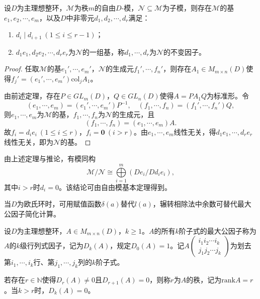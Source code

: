 \documentclass[../../main.tex]{subfiles}%
\begin{document}
\begin{corollary}
设$D$为主理想整环，$\mathscr{M}$为秩$m$的自由$D$-模，$\mathscr{N}\subseteq\mathscr{M}$为子模，则存在$\mathscr{M}$的基$e_1,e_2,\cdots,e_m$，以及$D$中非零元$d_1,d_2,\cdots,d_r$满足：
\begin{enumerate}[(1)]
\item $d_i\mid d_{i+1}\ (1\leqslant i\leqslant r-1)$；
\item $d_1e_1,d_2e_2,\cdots,d_re_r$为$\mathscr{N}$的一组基，称$d_1,\cdots,d_r$为$\mathscr{N}$的不变因子。
\end{enumerate}
\end{corollary}

\begin{proof}

任取$\mathscr{M}$的基$e_1',\cdots,e_m'$，$\mathscr{N}$的生成元$f_1',\cdots,f_n'$，则存在$A_1\in M_{m\times n}(D)$使得$f_j'=(e_1',\cdots,e_m')\mathrm{col}_jA_1$。

由前述定理，存在$P\in GL_m(D)$，$Q\in GL_n(D)$使得$A=PA_1Q$为标准形。令
$$(e_1,\cdots,e_m)=(e_1',\cdots,e_m')P^{-1},\quad (f_1,\cdots,f_n)=(f_1',\cdots,f_n')Q,$$
则$e_1,\cdots,e_m$为$\mathscr{M}$的基，$f_1,\cdots,f_n$为$\mathscr{N}$的生成元，且
$$(f_1,\cdots,f_n)=(e_1,\cdots,e_m)A.$$
故$f_i=d_ie_i\ (1\leqslant i\leqslant r)$，$f_i=\boldsymbol{0}\ (i>r)$。由$e_1,\cdots,e_m$线性无关，得$d_1e_1,\cdots,d_re_r$线性无关，即为$\mathscr{N}$的基。

\end{proof}

\begin{remark}
由上述定理与推论，有模同构
$$\mathscr{M}/\mathscr{N}\cong\bigoplus\limits_{i=1}^m(De_i/Dd_ie_i),$$
其中$i>r$时$d_i=0$。该结论可由自由模基本定理得到。
\end{remark}

\begin{remark}
当$D$为欧氏环时，可用赋值函数$\delta(a)$替代$l(a)$，辗转相除法中余数可替代最大公因子简化计算。
\end{remark}

\begin{definition}
设$D$为主理想整环，$A\in M_{m\times n}(D)$，$k\geqslant1$。$A$的所有$k$阶子式的最大公因子称为$A$的$k$级行列式因子，记为$D_k(A)$，规定$D_0(A)=1$。记$A\begin{pmatrix}i_1i_2\cdots i_k\\j_1j_2\cdots j_k\end{pmatrix}$为划去第$i_1,\cdots,i_k$行、第$j_1,\cdots,j_k$列的$k$阶子式。

若存在$r\in\mathbb{N}$使得$D_r(A)\neq0$且$D_{r+1}(A)=0$，则称$r$为$A$的秩，记为$\mathrm{rank}A=r$。当$k>r$时，$D_k(A)=0$。
\end{definition}
\end{document}
